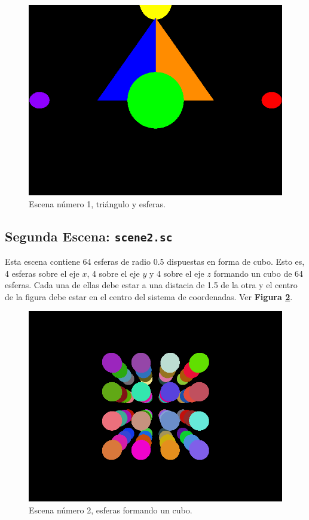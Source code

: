 \documentclass[a4paper,10pt]{article}
\begin{document}
\begin{figure}[h]
 \centering
 \includegraphics[width=320pt,keepaspectratio=true]{../scene1.png}
 \caption{Escena n\'umero 1, tri\'angulo y esferas.}
 \label{fig:1}
\end{figure}

\subsection{Segunda Escena: \texttt{scene2.sc}}
Esta escena contiene 64 esferas de radio 0.5 dispuestas en forma de cubo.  Esto es, 4 esferas sobre el eje $x$, 4 sobre el eje $y$ y 4 sobre el eje $z$ formando un cubo de 64 esferas. Cada una de ellas debe estar a una distacia de 1.5 de la otra y el centro de la figura debe estar en el centro del sistema de coordenadas. Ver \textbf{Figura \ref{fig:2}}.

\begin{figure}[h]
 \centering
 \includegraphics[width=320pt,keepaspectratio=true]{../scene2.png}
 \caption{Escena n\'umero 2, esferas formando un cubo.}
 \label{fig:2}
\end{figure}
\end{document}
